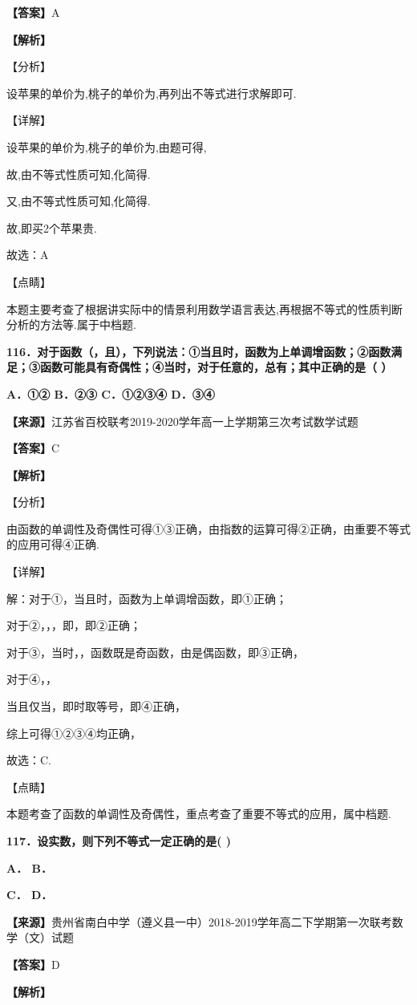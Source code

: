 \documentclass[
]{article}
\begin{document}
\textbf{【答案】}A

\textbf{【解析】}

【分析】

设苹果的单价为,桃子的单价为,再列出不等式进行求解即可.

【详解】

设苹果的单价为,桃子的单价为,由题可得,

故,由不等式性质可知,化简得.

又,由不等式性质可知,化简得.

故,即买2个苹果贵.

故选：A

【点睛】

本题主要考查了根据讲实际中的情景利用数学语言表达,再根据不等式的性质判断分析的方法等.属于中档题.

\textbf{116．对于函数（，且），下列说法：①当且时，函数为上单调增函数；②函数满足；③函数可能具有奇偶性；④当时，对于任意的，总有；其中正确的是（
）}

\textbf{A．①② B．②③ C．①②③④ D．③④}

\textbf{【来源】}江苏省百校联考2019-2020学年高一上学期第三次考试数学试题

\textbf{【答案】}C

\textbf{【解析】}

【分析】

由函数的单调性及奇偶性可得①③正确，由指数的运算可得②正确，由重要不等式的应用可得④正确.

【详解】

解：对于①，当且时，函数为上单调增函数，即①正确；

对于②，，，即，即②正确；

对于③，当时，，函数既是奇函数，由是偶函数，即③正确，

对于④，，

当且仅当，即时取等号，即④正确，

综上可得①②③④均正确，

故选：C.

【点睛】

本题考查了函数的单调性及奇偶性，重点考查了重要不等式的应用，属中档题.

\textbf{117．设实数，则下列不等式一定正确的是( )}

\textbf{A． B．}

\textbf{C． D．}

\textbf{【来源】}贵州省南白中学（遵义县一中）2018-2019学年高二下学期第一次联考数学（文）试题

\textbf{【答案】}D

\textbf{【解析】}
\end{document}
